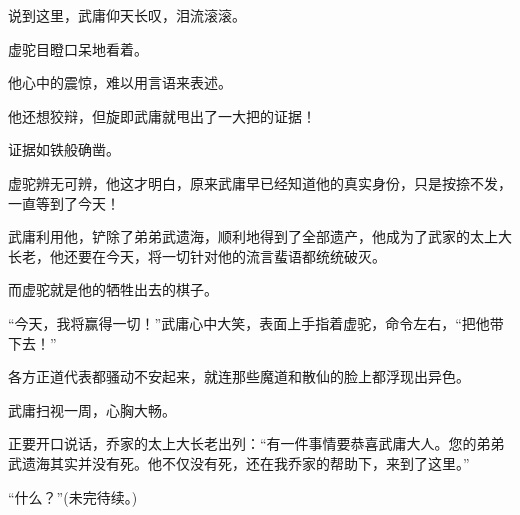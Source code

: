 \begin{this_body}
说到这里，武庸仰天长叹，泪流滚滚。

虚驼目瞪口呆地看着。

他心中的震惊，难以用言语来表述。

他还想狡辩，但旋即武庸就甩出了一大把的证据！

证据如铁般确凿。

虚驼辨无可辨，他这才明白，原来武庸早已经知道他的真实身份，只是按捺不发，一直等到了今天！

武庸利用他，铲除了弟弟武遗海，顺利地得到了全部遗产，他成为了武家的太上大长老，他还要在今天，将一切针对他的流言蜚语都统统破灭。

而虚驼就是他的牺牲出去的棋子。

“今天，我将赢得一切！”武庸心中大笑，表面上手指着虚驼，命令左右，“把他带下去！”

各方正道代表都骚动不安起来，就连那些魔道和散仙的脸上都浮现出异色。

武庸扫视一周，心胸大畅。

正要开口说话，乔家的太上大长老出列：“有一件事情要恭喜武庸大人。您的弟弟武遗海其实并没有死。他不仅没有死，还在我乔家的帮助下，来到了这里。”

“什么？”(未完待续。)

\end{this_body}

